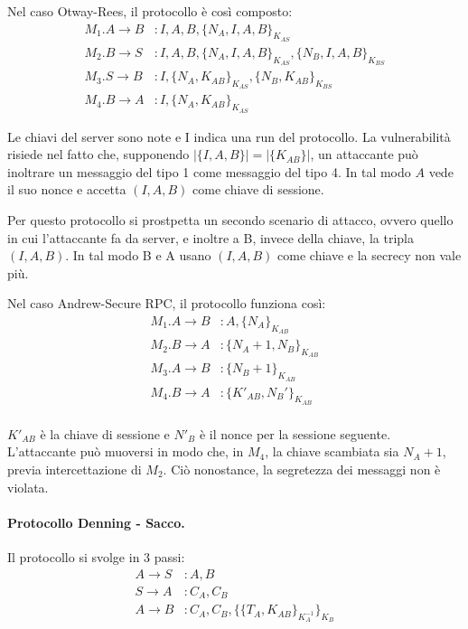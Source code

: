 \documentclass[a4paper, 10pt, twoside]{article}
\begin{document}
	Nel caso Otway-Rees, il protocollo è così composto: \begin{align*}
		M_1. A \to B&: I,A,B, \lbrace N_A, I, A, B\rbrace_{K_{AS}} \\
		M_2. B \to S&: I,A,B, \lbrace N_A, I, A, B\rbrace_{K_{AS}}, \lbrace N_B, I, A, B\rbrace_{K_{BS}} \\
		M_3. S \to B&: I, \lbrace N_A, K_{AB}\rbrace_{K_{AS}}, \lbrace N_B, K_{AB}\rbrace_{K_{BS}}\\
		M_4. B \to A&: I, \lbrace N_A, K_{AB}\rbrace_{K_{AS}}
	\end{align*}

	Le chiavi del server sono note e I indica una run del protocollo.
	La vulnerabilità risiede nel fatto che, supponendo $\vert \lbrace I,A,B\rbrace\vert = \vert\lbrace K_{AB} \rbrace\vert$, un attaccante può inoltrare un messaggio del tipo 1 come messaggio del tipo 4. In tal modo $A$ vede il suo nonce e accetta $(I, A, B)$ come chiave di sessione.

	Per questo protocollo si prostpetta un secondo scenario di attacco, ovvero quello in cui l'attaccante fa da server, e inoltre a B, invece della chiave, la tripla $(I, A, B)$. In tal modo B e A usano $(I, A, B)$ come chiave e la secrecy non vale più.
	
	Nel caso Andrew-Secure RPC, il protocollo funziona così: \begin{align*}
		M_1. A \to B&: A, \lbrace N_A\rbrace_{K_{AB}}\\
		M_2. B \to A&: \lbrace N_A +1, N_B\rbrace_{K_{AB}}\\
		M_3. A \to B&: \lbrace N_B + 1\rbrace_{K_{AB}}\\
		M_4. B \to A&: \lbrace K'_{AB}, N_B'\rbrace_{K_{AB}}\\
	\end{align*}

	$K'_{AB}$ è la chiave di sessione e $N'_B$ è il nonce per la sessione seguente. L'attaccante può muoversi in modo che, in $M_4$, la chiave scambiata sia $N_A + 1$, previa intercettazione di $M_2$. Ciò nonostance, la segretezza dei messaggi non è violata.

	\paragraph{Protocollo Denning - Sacco.}
	Il protocollo si svolge in 3 passi: \begin{align*}
		A\to S&: A, B \\
		S\to A&: C_A, C_B \\
		A \to B&: C_A, C_B, \lbrace\lbrace T_A, K_{AB}\rbrace_{K_A^{-1}}\rbrace_{K_B}
	\end{align*}
\end{document}
